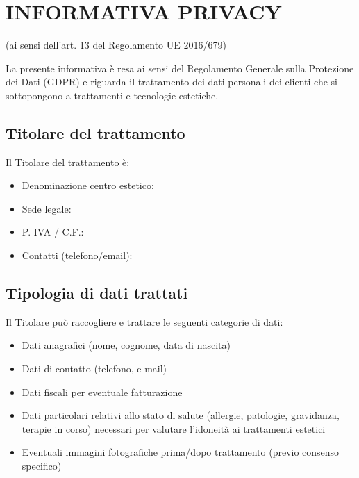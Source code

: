 \newpage

\section{INFORMATIVA PRIVACY}
\begin{center}
	(ai sensi dell'art. 13 del Regolamento UE 2016/679)
\end{center}

La presente informativa è resa ai sensi del Regolamento Generale sulla Protezione dei Dati (GDPR) e riguarda il trattamento dei dati personali dei clienti che si sottopongono a trattamenti e tecnologie estetiche.

\subsection*{Titolare del trattamento}

Il Titolare del trattamento è:

\begin{itemize}
	\item Denominazione centro estetico: \underline{\hspace{5cm}}
	\item Sede legale: \underline{\hspace{7cm}}
	\item P. IVA / C.F.: \underline{\hspace{6cm}}
	\item Contatti (telefono/email): \underline{\hspace{5cm}}
\end{itemize}

\subsection*{Tipologia di dati trattati}

Il Titolare può raccogliere e trattare le seguenti categorie di dati:

\begin{itemize}
	\item Dati anagrafici (nome, cognome, data di nascita)
	\item Dati di contatto (telefono, e-mail)
	\item Dati fiscali per eventuale fatturazione
	\item Dati particolari relativi allo stato di salute (allergie, patologie, gravidanza, terapie in corso) necessari per valutare l'idoneità ai trattamenti estetici
	\item Eventuali immagini fotografiche prima/dopo trattamento (previo consenso specifico)
\end{itemize}

